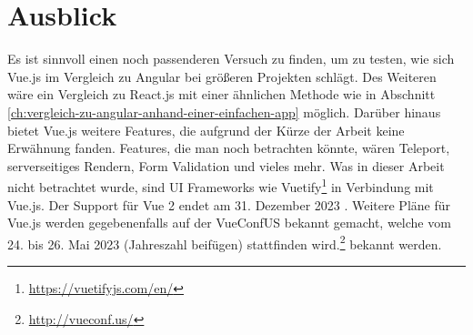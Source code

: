 
\chapter{Ausblick}
Es ist sinnvoll einen noch passenderen Versuch zu finden, um zu testen,
wie sich Vue.js im Vergleich zu Angular bei größeren Projekten schlägt.
Des Weiteren wäre ein Vergleich zu React.js mit einer ähnlichen Methode wie in Abschnitt \ref{ch:vergleich-zu-angular-anhand-einer-einfachen-app} möglich.
Darüber hinaus bietet Vue.js weitere Features, die aufgrund der Kürze der Arbeit keine Erwähnung fanden.
Features, die man noch betrachten könnte, wären Teleport, serverseitiges Rendern, Form Validation und vieles mehr.
Was in dieser Arbeit nicht betrachtet wurde, sind UI Frameworks wie Vuetify\footnote{\url{https://vuetifyjs.com/en/}} in Verbindung mit Vue.js.
Der Support für Vue 2 endet am 31. Dezember 2023 \cite{vueFAQ}.
Weitere Pläne für Vue.js werden gegebenenfalls auf der VueConfUS bekannt gemacht, welche vom 24. bis 26. Mai 2023 (Jahreszahl beifügen) stattfinden wird.\footnote{\url{http://vueconf.us/}} bekannt werden.